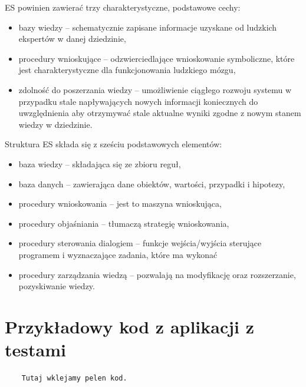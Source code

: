 \documentclass[12pt,a4paper]{article}
\begin{document}
	ES powinien zawierać trzy charakterystyczne, podstawowe cechy:
	\begin{itemize}
		\item bazy wiedzy -- schematycznie zapisane informacje uzyskane od ludzkich ekspertów w danej dziedzinie,
		\item procedury wnioskujące -- odzwierciedlające wnioskowanie symboliczne, które jest charakterystyczne dla funkcjonowania ludzkiego mózgu,
		\item zdolność do poszerzania wiedzy -- umożliwienie ciągłego rozwoju systemu w przypadku stale napływających nowych informacji koniecznych do uwzględnienia aby otrzymywać stale aktualne wyniki zgodne z nowym stanem wiedzy w dziedzinie.
	\end{itemize}
	\bigskip
	
	Struktura ES składa się z sześciu podstawowych elementów:
	\begin{itemize}
		\item baza wiedzy -- składająca się ze zbioru reguł,
		\item baza danych -- zawierająca dane obiektów, wartości, przypadki i hipotezy,
		\item procedury wnioskowania -- jest to maszyna wnioskująca,
		\item procedury objaśniania -- tłumaczą strategię wnioskowania,
		\item procedury sterowania dialogiem -- funkcje wejścia/wyjścia sterujące programem i wyznaczające zadania, które ma wykonać
		\item procedury zarządzania wiedzą -- pozwalają na modyfikację oraz rozszerzanie, pozyskiwanie wiedzy.
	\end{itemize}
	
	
	
	
	
	
	

\section*{Przykładowy kod z aplikacji z testami}


\begin{lstlisting}
	Tutaj wklejamy pelen kod. 
\end{lstlisting}
\end{document}
